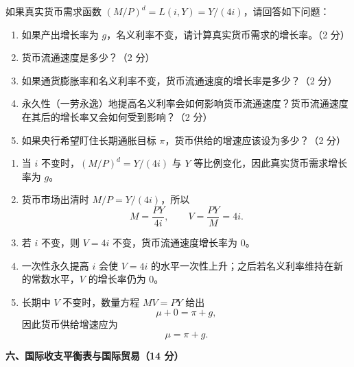 \begin{question}
如果真实货币需求函数 $(M/P)^d=L(i,Y)=Y/(4i)$，请回答如下问题：
\begin{enumerate}[label=(\alph*),leftmargin=2.5em]
  \item 如果产出增长率为 $g$，名义利率不变，请计算真实货币需求的增长率。（2 分）
  \item 货币流通速度是多少？（2 分）
  \item 如果通货膨胀率和名义利率不变，货币流通速度的增长率是多少？（2 分）
  \item 永久性（一劳永逸）地提高名义利率会如何影响货币流通速度？货币流通速度在其后的增长率又会如何受到影响？（2 分）
  \item 如果央行希望盯住长期通胀目标 $\pi$，货币供给的增速应该设为多少？（2 分）
\end{enumerate}
\begin{solution}
\begin{enumerate}[label=(\alph*),leftmargin=2.5em]
  \item 当 $i$ 不变时，$(M/P)^d=Y/(4i)$ 与 $Y$ 等比例变化，因此真实货币需求增长率为 $g$。
  \item 货币市场出清时 $M/P=Y/(4i)$，所以
  \[
  M=\frac{PY}{4i},\qquad V=\frac{PY}{M}=4i.
  \]
  \item 若 $i$ 不变，则 $V=4i$ 不变，货币流通速度增长率为 $0$。
  \item 一次性永久提高 $i$ 会使 $V=4i$ 的水平一次性上升；之后若名义利率维持在新的常数水平，$V$ 的增长率仍为 $0$。
  \item 长期中 $V$ 不变时，数量方程 $MV=PY$ 给出
  \[
  \mu+0=\pi+g,
  \]
  因此货币供给增速应为
  \[
  \mu=\pi+g.
  \]
\end{enumerate}
\end{solution}
\end{question}

\textbf{六、国际收支平衡表与国际贸易（14 分）}

